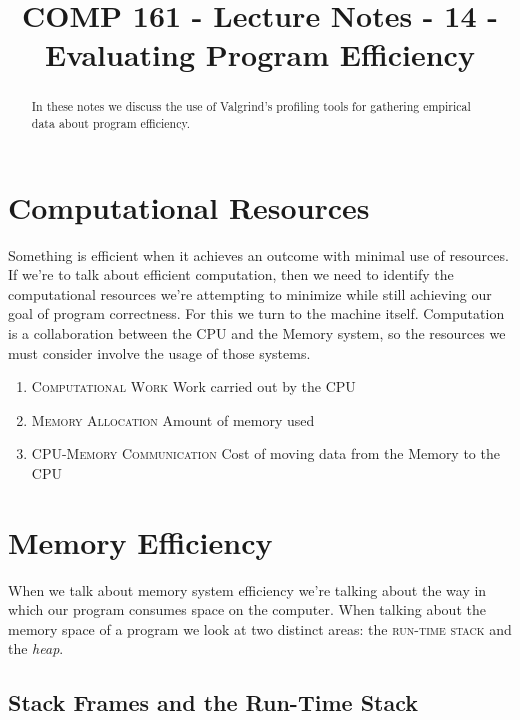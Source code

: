 \documentclass[]{tufte-handout}
\title{COMP 161 - Lecture Notes - 14 - Evaluating Program Efficiency}
\date{}
\begin{document}
 
\maketitle

\begin{abstract}
In these notes we discuss the use of Valgrind's profiling tools for gathering empirical data about program efficiency.
\end{abstract}

\section{Computational Resources}

Something is efficient when it achieves an outcome with minimal use of resources.  If we're to talk about efficient computation, then we need to identify the computational resources we're attempting to minimize while still achieving our goal of program correctness.  For this we turn to the machine itself. Computation is a collaboration between the CPU and the Memory system, so the resources we must consider involve the usage of those systems.
\begin{enumerate}
\item \textsc{Computational Work} Work carried out by the CPU
\item \textsc{Memory Allocation} Amount of memory used  
\item \textsc{CPU-Memory Communication} Cost of moving data from the Memory to the CPU
\end{enumerate}

\section{Memory Efficiency}

When we talk about memory system efficiency we're talking about the way in which our program consumes space on the computer.  When talking about the memory space of a program we look at two distinct areas: the \textsc{run-time stack} and the \textit{heap}.  

\subsection{Stack Frames and the Run-Time Stack}
\end{document}
